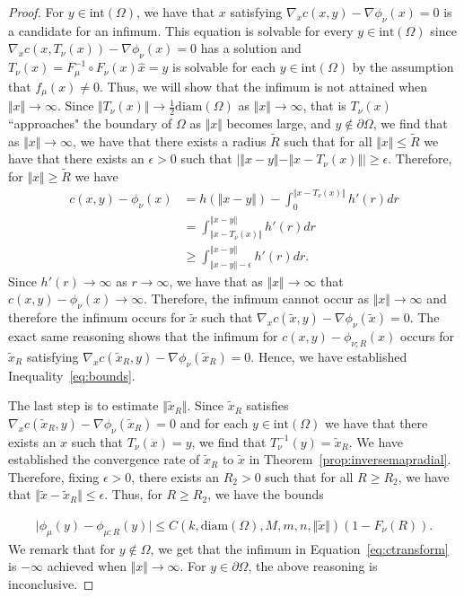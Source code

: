 \documentclass{amsart}
\theoremstyle{lemma}
\theoremstyle{remark}
\begin{document}
\begin{proof}
For $y \in \text{int}(\Omega)$, we have that $x$ satisfying $\nabla_{x}c(x,y) -\nabla \phi_{\nu}(x) =0$ is a candidate for an infimum. This equation is solvable for every $y \in \text{int}(\Omega)$ since $\nabla_{x}c(x,T_{\nu}(x)) -\nabla \phi_{\nu}(x) =0$ has a solution and $T_{\nu}(x) = F_{\mu}^{-1} \circ F_{\nu}(x) \hat{x} = y$ is solvable for each $y \in \text{int}(\Omega)$ by the assumption that $f_{\mu}(x) \neq 0$. Thus, we will show that the infimum is not attained when $\Vert x \Vert \rightarrow \infty$. Since $\Vert T_{\nu}(x) \Vert \rightarrow \frac{1}{2} \text{diam}(\Omega)$ as $\Vert x \Vert \rightarrow \infty$, that is $T_{\nu}(x)$ ``approaches" the boundary of $\Omega$ as $\Vert x \Vert$ becomes large, and $y \notin \partial \Omega$, we find that as $\Vert x \Vert \rightarrow \infty$, we have that there exists a radius $\tilde{R}$ such that for all $\Vert x \Vert \leq \tilde{R}$ we have that there exists an $\epsilon>0$ such that $\vert \Vert x - y \Vert - \Vert x - T_{\nu}(x) \Vert \vert \geq \epsilon$. Therefore, for $\Vert x \Vert \geq \tilde{R}$ we have
\begin{align}
c(x,y) - \phi_{\nu}(x) &= h(\Vert x - y \Vert) - \int_{0}^{\Vert x - T_{\nu}(x) \Vert} h'(r)dr \\
&= \int_{\Vert x - T_{\nu}(x) \Vert}^{\Vert x - y \Vert} h'(r)dr \\
&\geq \int_{\Vert x - y \Vert - \epsilon}^{\Vert x - y \Vert} h'(r)dr.
\end{align}
Since $h'(r) \rightarrow \infty$ as $r \rightarrow \infty$, we have that as $\Vert x \Vert \rightarrow \infty$ that $c(x,y) - \phi_{\nu}(x) \rightarrow \infty$. Therefore, the infimum cannot occur as $\Vert x \Vert \rightarrow \infty$ and therefore the infimum occurs for $\tilde{x}$ such that $\nabla_{x}c(\tilde{x},y) -\nabla \phi_{\nu}(\tilde{x}) =0$. The exact same reasoning shows that the infimum for $c(x,y) - \phi_{\nu;R}(x)$ occurs for $\tilde{x}_{R}$ satisfying $\nabla_{x}c(\tilde{x}_{R},y) -\nabla \phi_{\nu}(\tilde{x}_{R}) =0$. Hence, we have established Inequality~\eqref{eq:bounds}.

The last step is to estimate $\Vert \tilde{x}_{R} \Vert$. Since $\tilde{x}_{R}$ satisfies $\nabla_{x}c(\tilde{x}_{R},y) -\nabla \phi_{\nu}(\tilde{x}_{R}) =0$ and for each $y \in \text{int}(\Omega)$ we have that there exists an $x$ such that $T_{\nu}(x) = y$, we find that $T_{\nu}^{-1}(y) = \tilde{x}_{R}$. We have established the convergence rate of $\tilde{x}_{R}$ to $\tilde{x}$ in Theorem~\ref{prop:inversemapradial}. Therefore, fixing $\epsilon>0$, there exists an $R_{2} >0$ such that for all $R \geq R_2$, we have that $\Vert \tilde{x} - \tilde{x}_{R} \Vert \leq \epsilon$. Thus, for $R \geq R_2$, we have the bounds

\begin{align}\label{eq:boundsv2}
\vert \phi_{\mu}(y) - \phi_{\mu;R}(y) \vert \leq C(k, \text{diam}(\Omega), M, m, n, \Vert \tilde{x} \Vert) (1-F_{\nu}(R)).
\end{align}
We remark that for $y \notin \Omega$, we get that the infimum in Equation~\eqref{eq:ctransform} is $-\infty$ achieved when $\Vert x \Vert \rightarrow \infty$. For $y \in \partial \Omega$, the above reasoning is inconclusive.
\end{proof}
\end{document}
